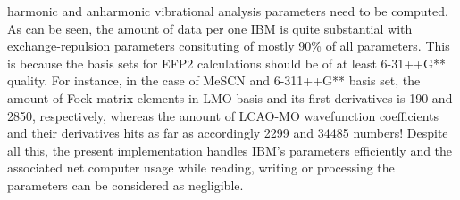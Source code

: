 \documentclass[a4paper,titlepage,twoside,fleqn,12pt]{book}
\begin{document}
\begin{refsection}
harmonic and anharmonic vibrational analysis parameters
need to be computed. As can be seen, the amount of data per one IBM is quite
substantial with exchange\hyp{}repulsion parameters consituting of mostly 90\% 
of all parameters. This is because the basis sets for EFP2 calculations
should be of at least 6-31++G** quality.
For instance, in the case of MeSCN and 6-311++G** basis set, 
the amount of Fock matrix elements in LMO basis
and its first derivatives
is 190 and 2850, respectively,
whereas the amount of LCAO-MO wavefunction coefficients and their derivatives
hits as far as accordingly 2299 and 34485 numbers!
Despite all this, the present implementation handles IBM's parameters
efficiently and the associated net computer usage while reading, writing
or processing the parameters
can be considered as negligible.


\end{refsection}
\end{document}
